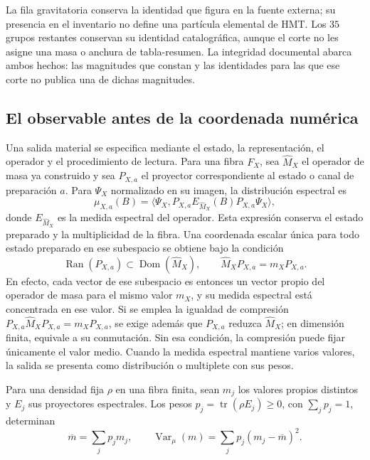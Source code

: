 La fila gravitatoria conserva la identidad que figura en la fuente externa;
su presencia en el inventario no define una partícula elemental de HMT.
Los \(35\) grupos restantes conservan su identidad catalográfica, aunque
el corte no les asigne una masa o anchura de tabla-resumen. La integridad
documental abarca ambos hechos: las magnitudes que constan y las identidades
para las que ese corte no publica una de dichas magnitudes.

\subsection{El observable antes de la coordenada numérica}
\label{vi:subsec:vi-tipos-observable}

Una salida material se especifica mediante el estado, la representación,
el operador y el procedimiento de lectura. Para una fibra \(F_X\), sea
\(\widehat M_X\) el operador de masa ya construido y sea \(P_{X,a}\)
el proyector correspondiente al estado o canal de preparación \(a\).
Para \(\Psi_X\) normalizado en su imagen, la distribución espectral es
\[
 \mu_{X,a}(B)
 =\langle\Psi_X,
   P_{X,a}E_{\widehat M_X}(B)P_{X,a}\Psi_X\rangle,
\]
donde \(E_{\widehat M_X}\) es la medida espectral del operador. Esta
expresión conserva el estado preparado y la multiplicidad de la fibra.
Una coordenada escalar única para todo estado preparado en ese subespacio
se obtiene bajo la condición
\[
 \operatorname{Ran}(P_{X,a})\subset\operatorname{Dom}(\widehat M_X),
 \qquad \widehat M_XP_{X,a}=m_XP_{X,a}.
\]
En efecto, cada vector de ese subespacio es entonces un vector propio del
operador de masa para el mismo valor \(m_X\), y su medida espectral está
concentrada en ese valor. Si se emplea la igualdad de compresión
\(P_{X,a}\widehat M_XP_{X,a}=m_XP_{X,a}\), se exige además que
\(P_{X,a}\) reduzca \(\widehat M_X\); en dimensión finita, equivale
a su conmutación. Sin esa condición, la compresión puede fijar únicamente
el valor medio. Cuando la medida espectral mantiene varios valores, la
salida se presenta como distribución o multiplete con sus pesos.

Para una densidad fija \(\rho\) en una fibra finita, sean \(m_j\)
los valores propios distintos y \(E_j\) sus proyectores espectrales.
Los pesos \(p_j=\operatorname{tr}(\rho E_j)\geq0\), con
\(\sum_jp_j=1\), determinan
\[
 \overline m=\sum_jp_jm_j,\qquad
 \operatorname{Var}_{\mu}(m)=\sum_jp_j(m_j-\overline m)^2.
\]
